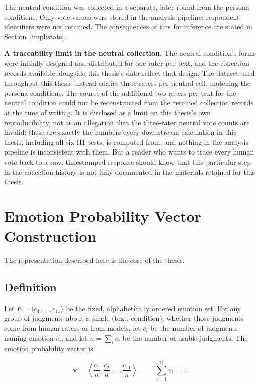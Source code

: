 The neutral condition was collected in a separate, later round from the persona conditions. Only
vote values were stored in the analysis pipeline; respondent identifiers were not retained. The
consequences of this for inference are stated in Section~\ref{impl:stats}.

\textbf{A traceability limit in the neutral collection.} The neutral condition's forms were
initially designed and distributed for one rater per text, and the collection records available
alongside this thesis's data reflect that design. The dataset used throughout this thesis instead
carries three raters per neutral cell, matching the persona conditions. The source of the
additional two raters per text for the neutral condition could not be reconstructed from the
retained collection records at the time of writing. It is disclosed as a limit on this thesis's
own reproducibility, not as an allegation that the three-rater neutral vote counts are invalid:
these are exactly the numbers every downstream calculation in this thesis, including all six H1
tests, is computed from, and nothing in the analysis pipeline is inconsistent with them. But a
reader who wants to trace every human vote back to a raw, timestamped response should know that
this particular step in the collection history is not fully documented in the materials retained
for this thesis.

\section{Emotion Probability Vector Construction}
\label{impl:vectors}

\noindent
The representation described here is the core of the thesis.

\subsection{Definition}
\label{impl:vecdef}

\noindent
Let $E = \langle e_1, \ldots, e_{11}\rangle$ be the fixed, alphabetically ordered emotion set.
For any group of judgments about a single (text, condition), whether those judgments come from
human raters or from models, let $c_i$ be the number of judgments naming emotion $e_i$, and let
$n = \sum_i c_i$ be the number of usable judgments. The emotion probability vector is

\begin{equation}
\mathbf{v} = \left\langle \frac{c_1}{n}, \frac{c_2}{n}, \ldots, \frac{c_{11}}{n} \right\rangle,
\qquad \sum_{i=1}^{11} v_i = 1 .
\end{equation}


